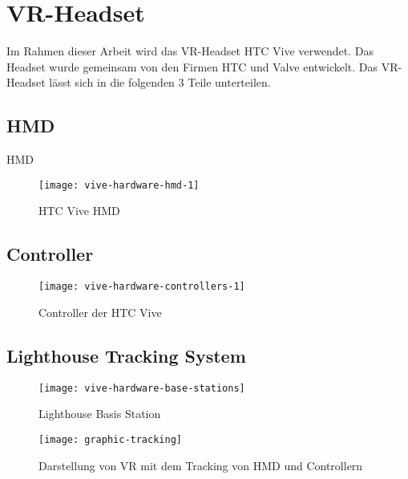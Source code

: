 \section{\acs{VR}-Headset}
Im Rahmen dieser Arbeit wird das \acs{VR}-Headset HTC Vive verwendet. Das Headset wurde gemeinsam von den Firmen HTC und Valve entwickelt. Das \acs{VR}-Headset lässt sich in die folgenden 3 Teile unterteilen. 

\subsection{\acl{HMD}}
\ac{HMD}

\begin{figure}[!htbp]
	\centering
	\texttt{[image: vive-hardware-hmd-1]}
	\caption[HTC Vive HMD]{HTC Vive \acs{HMD} \cite{ViveHMD}}
	\label{fig:vive-hardware-hmd-1}
\end{figure}


\subsection{Controller}
\begin{figure}[!htbp]
	\centering
	\texttt{[image: vive-hardware-controllers-1]}
	\caption[Controller der HTC Vive]{Controller der HTC Vive \cite{ViveControllers}}
	\label{fig:vive-hardware-controllers-1}
\end{figure}

\subsection{Lighthouse Tracking System}
\begin{figure}[!htbp]
	\centering
	\texttt{[image: vive-hardware-base-stations]}
	\caption[Lighthouse Basis Station]{Lighthouse Basis Station \cite{ViveBaseStation}}
	\label{fig:vive-hardware-base-stations}
\end{figure}

\begin{figure}[!htbp]
	\centering
	\texttt{[image: graphic-tracking]}
	\caption[Darstellung von VR mit dem Tracking von HMD und Controllern]{Darstellung von VR mit dem Tracking von HMD und Controllern \cite{VentureBeat}}
	\label{fig:graphic-tracking}
\end{figure}


